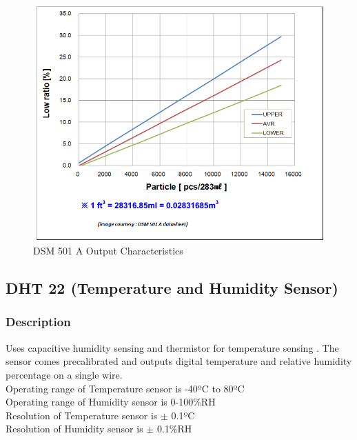 \documentclass[a4paper,12pt]{article}
\begin{document}
\begin{figure}[!ht]
\centering
\includegraphics[scale=0.5]{dsm_2.png}
\caption{DSM 501 A Output Characteristics }
\label{fig:dsm_out_char}
\end{figure}

\subsection{DHT 22 (Temperature and Humidity Sensor)}
\subsubsection{Description} 
Uses capacitive humidity sensing and thermistor for temperature sensing \cite{dht22_datasheet}. The sensor comes precalibrated and outputs digital temperature and relative humidity percentage on a single wire. \\

Operating range of Temperature sensor is -40ºC to 80ºC \\
Operating range of Humidity sensor is 0-100\%RH \\
Resolution of Temperature sensor is $\pm$ 0.1ºC \\
Resolution of Humidity sensor is $\pm $ 0.1\%RH
\end{document}
